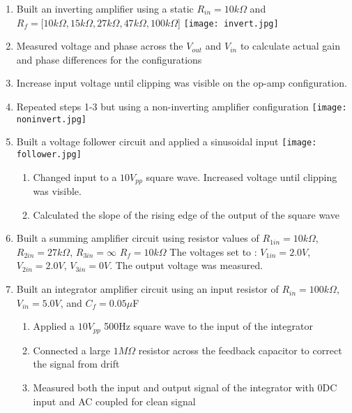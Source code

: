 \documentclass{article}
\begin{document}
\begin{enumerate}
\item Built an inverting amplifier using a static $R_{in} = 10 k\Omega $ \newline and $R_{f} = [10k\Omega, 15k\Omega, 27k\Omega, 47k\Omega, 100k\Omega$] \newline
\texttt{[image: invert.jpg]}
\item Measured voltage and phase across the $V_{out}$ and $V_{in}$ to calculate actual gain and phase differences for the configurations
\item Increase input voltage until clipping was visible on the op-amp configuration.
\item Repeated steps 1-3 but using a non-inverting amplifier configuration \newline 
\texttt{[image: noninvert.jpg]}
\item Built a voltage follower circuit and applied a sinusoidal input \newline 
\texttt{[image: follower.jpg]}
\begin{enumerate}
\item Changed input to a $10V_{pp}$ square wave. Increased voltage until clipping was visible.
\item Calculated the slope of the rising edge of the output of the square wave
\end{enumerate}
\item Built a summing amplifier circuit using resistor values of  {$R_{1in} = 10k\Omega$, $R_{2in} = 27k\Omega$, $R_{3in} = \infty$ \newline
$R_{f} = 10k\Omega$} The voltages set to : {$V_{1in} = 2.0V$, $V_{2in} = 2.0V$, $V_{3in} = 0V$}. The output voltage was measured.
\item Built an integrator amplifier circuit using an input resistor of $R_{in} = 100k\Omega$, $V_{in} = 5.0V$, and $C_{f} = 0.05$$\mu$F
\begin{enumerate}
\item Applied a $10V_{pp}$ 500Hz square wave to the input of the integrator
\item Connected a large $1M\Omega$ resistor across the feedback capacitor to correct the signal from drift
\item Measured both the input and output signal of the integrator with 0DC input and AC coupled for clean signal
\end {enumerate}
\end{enumerate}
\end{document}
